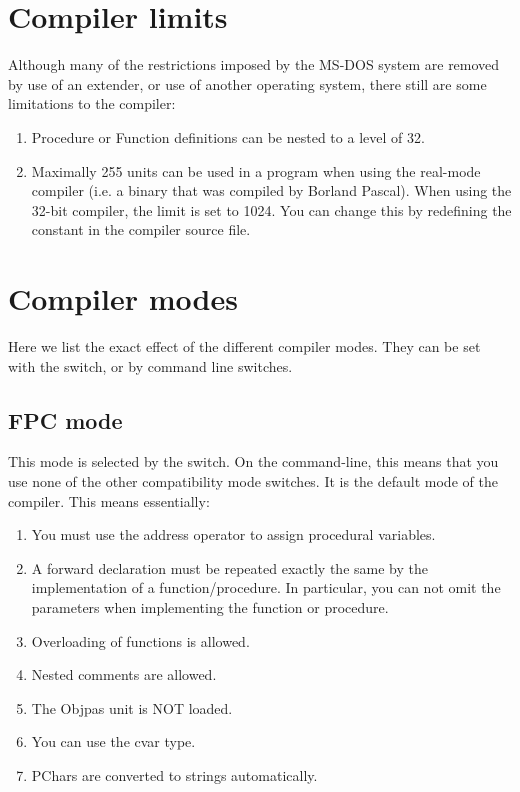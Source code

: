 \documentclass{report}
\begin{document}
\chapter{Compiler limits}
\label{ch:AppC}
Although many of the restrictions imposed by the MS-DOS system are removed
by use of an extender, or use of another operating system, there still are
some limitations to the compiler:
\begin{enumerate}
\item Procedure or Function definitions can be nested to a level of 32.
\item Maximally 255 units can be used in a program when using the real-mode
compiler (i.e. a binary that was compiled by Borland Pascal). When using the 32-bit compiler, the limit is set to 1024. You can
change this by redefining the  constant in the 
 compiler source file.
\end{enumerate}

\chapter{Compiler modes}
\label{ch:AppD}

Here we list the exact effect of the different compiler modes. They can be
set with the  switch, or by command line switches.

\section{FPC mode}
This mode is selected by the  switch. On the command-line,
this means that you use none of the other compatibility mode switches.
It is the default mode of the compiler. This means essentially:
\begin{enumerate}
\item You must use the address operator to assign procedural variables.
\item A forward declaration must be repeated exactly the same by the
implementation of a function/procedure. In particular, you can not omit the
parameters when implementing the function or procedure.
\item Overloading of functions is allowed.
\item Nested comments are allowed.
\item The Objpas unit is NOT loaded.
\item You can use the cvar type.
\item PChars are converted to strings automatically.
\end{enumerate}
\end{document}
